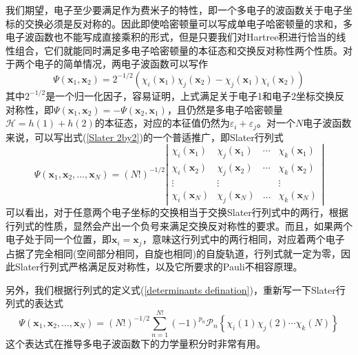 \documentclass[12pt,a4paper,openany,twoside]{book}
\numberwithin{equation}{section}
\begin{document}
          我们期望，电子至少要满足作为费米子的特性，即一个多电子的波函数关于电子坐标的交换必须是反对称的。因此即使哈密顿量可以写成单电子哈密顿量的求和，多电子波函数也不能写成直接乘积的形式，但是只要我们对Hartree积进行恰当的线性组合，它们就能同时满足多电子哈密顿量的本征态和交换反对称性两个性质。对于两个电子的简单情况，两电子波函数可以写作
          \begin{equation}
            \Psi\left(\mathbf{x}_{1}, \mathbf{x}_{2}\right)=2^{-1 / 2}\left(\chi_{i}\left(\mathbf{x}_{1}\right) \chi_{j}\left(\mathbf{x}_{2}\right)-\chi_{j}\left(\mathbf{x}_{1}\right) \chi_{i}\left(\mathbf{x}_{2}\right)\right)
            \label{Slater 2by2}
          \end{equation}
          其中$2^{-1 / 2}$是一个归一化因子，容易证明，上式满足关于电子1和电子2坐标交换反对称性，即$\Psi\left(\mathbf{x}_{1}, \mathbf{x}_{2}\right) = -\Psi\left(\mathbf{x}_{2}, \mathbf{x}_{1}\right)$，且仍然是多电子哈密顿量$\mathscr{H}=h(1)+h(2)$的本征态，对应的本征值仍然为$\varepsilon_i + \varepsilon_j$。对一个$N$电子波函数来说，可以写出式(\ref{Slater 2by2})的一个普适推广，即Slater行列式
          \begin{equation}
            \Psi\left(\mathbf{x}_{1}, \mathbf{x}_{2}, \ldots, \mathbf{x}_{N}\right)=(N !)^{-1 / 2} \left| \begin{array}{cccc}{\chi_{i}\left(\mathbf{x}_{1}\right)} & {\chi_{j}\left(\mathbf{x}_{1}\right)} & {\cdots} & {\chi_{k}\left(\mathbf{x}_{1}\right)} \\ {\chi_{i}\left(\mathbf{x}_{2}\right)} & {\chi_{j}\left(\mathbf{x}_{2}\right)} & {\cdots} & {\chi_{k}\left(\mathbf{x}_{2}\right)} \\ {\vdots} & {\vdots} & { } & {\vdots} \\ {\chi_{i}\left(\mathbf{x}_{N}\right)} & {\chi_{j}\left(\mathbf{x}_{N}\right)} & {\ldots} & {\chi_{k}\left(\mathbf{x}_{N}\right)}\end{array}\right|
            \label{Slater Determinant}
          \end{equation}
          可以看出，对于任意两个电子坐标的交换相当于交换Slater行列式中的两行，根据行列式的性质，显然会产出一个负号来满足交换反对称性的要求。而且，如果两个电子处于同一个位置，即$\mathbf{x}_{i}=\mathbf{x}_{j}$，意味这行列式中的两行相同，对应着两个电子占据了完全相同(空间部分相同，自旋也相同)的自旋轨道，行列式就一定为零，因此Slater行列式严格满足反对称性，以及它所要求的Pauli不相容原理。

          另外，我们根据行列式的定义式(\ref{determinants defination})，重新写一下Slater行列式的表达式
          \begin{equation}
            \Psi\left(\mathbf{x}_{1}, \mathbf{x}_{2}, \ldots, \mathbf{x}_{N}\right)=(N !)^{-1 / 2} \sum_{n=1}^{N !}(-1)^{p_{n}} \mathscr{P}_{n}\left\{\chi_{i}(1) \chi_{j}(2) \cdots \chi_{k}(N)\right\}
          \end{equation}
          这个表达式在推导多电子波函数下的力学量积分时非常有用。
          
\end{document}
